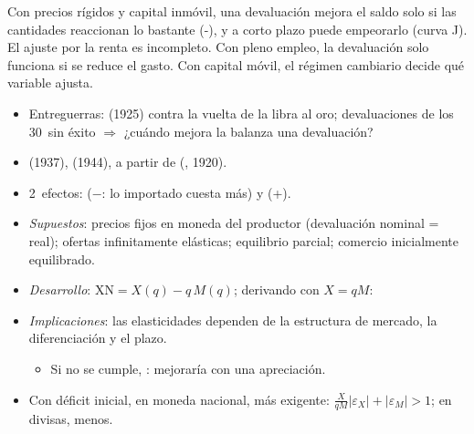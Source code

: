 \documentclass{article}
\begin{document}
\begin{columnas}
\begin{ideaclave}
Con precios rígidos y capital inmóvil, una devaluación mejora el saldo solo si las cantidades reaccionan lo bastante (-), y a corto plazo puede empeorarlo (curva J). El ajuste por la renta es incompleto. Con pleno empleo, la devaluación solo funciona si se reduce el gasto. Con capital móvil, el régimen cambiario decide qué variable ajusta.
\end{ideaclave}

\begin{itemize}
\item Entreguerras:  (1925) contra la vuelta de la libra al oro; devaluaciones de los 30~sin éxito $\Rightarrow$ ¿cuándo mejora la balanza una devaluación?
\item {} (1937),  (1944), a partir de  (, 1920).
\item 2~efectos:  ($-$: lo importado cuesta más) y  (+).
\end{itemize}
\begin{itemize}
\item \emph{Supuestos}: precios fijos en moneda del productor (devaluación nominal = real); ofertas infinitamente elásticas; equilibrio parcial; comercio inicialmente equilibrado.
\item \emph{Desarrollo}: $\mathrm{XN}=X(q)-q\,M(q)$; derivando con $X=qM$:
\item \emph{Implicaciones}: las elasticidades dependen de la estructura de mercado, la diferenciación y el plazo.
  \begin{itemize}
  \item Si no se cumple, : mejoraría con una apreciación.
  \end{itemize}
\end{itemize}
\begin{itemize}
\item Con déficit inicial, en moneda nacional, más exigente: $\frac{X}{qM}\lvert\varepsilon_X\rvert+\lvert\varepsilon_M\rvert>1$; en divisas, menos.

\end{itemize}
\end{columnas}
\end{document}

